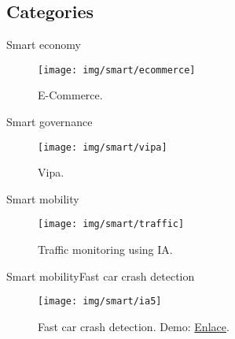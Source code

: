 \documentclass[10pt]{beamer}
\newcommand{\chref}[2]{	\href{#1}{{\usebeamercolor[bg]{Feather}#2}}}
\newcommand{\chref}[3][blue]{\href{#2}{\color{#1}{#3}}}%
\newcommand{\1}{
        	\setbeamertemplate{background}{
        		\texttt{[image: img/1]}
        		\tikz[overlay] \fill[fill opacity=0.75,fill=white] (0,0) rectangle (-\paperwidth,\paperheight);
        	}
}
\begin{document}
\subsection{Categories}

\begin{frame}{Smart economy}{}
	\begin{figure}
		\texttt{[image: img/smart/ecommerce]}
		\caption{E-Commerce.}
	\end{figure}
\end{frame}

\begin{frame}{Smart governance}{}
	\begin{figure}
		\texttt{[image: img/smart/vipa]}
		\caption{Vipa.}
	\end{figure}
\end{frame}

\begin{frame}{Smart mobility}{}
	\begin{figure}
		\texttt{[image: img/smart/traffic]}
		\caption{Traffic monitoring using IA.}
	\end{figure}
\end{frame}


\begin{frame}{Smart mobility}{Fast car crash detection}
	\begin{figure}[]
		\centering
		\texttt{[image: img/smart/ia5]}
		\label{img:mot2}
		\caption{Fast car crash detection. Demo: \chref{https://www.youtube.com/watch?v=jVbixJvuDVw}{Enlace}.}
	\end{figure}
\end{frame}
\end{document}
